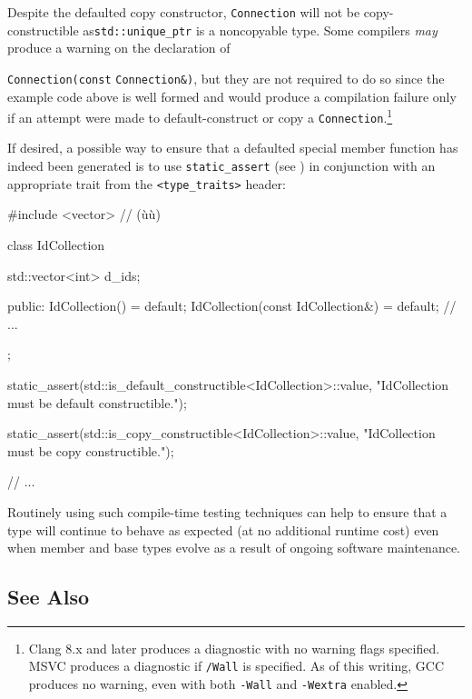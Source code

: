 \noindent Despite the defaulted copy constructor, \lstinline!Connection! will not be
copy-constructible as\linebreak[4] \lstinline!std::unique_ptr! is a noncopyable type.
Some compilers \emph{may} produce a warning on the declaration of
{\lstinline!Connection(const! \lstinline!Connection&)!, but they are not
required to do so since the example code above is well formed and would produce a
compilation failure only if an attempt were made to default-construct or
copy a \lstinline!Connection!.{\cprotect\footnote{Clang 8.x
and later produces a diagnostic with no warning flags specified.
MSVC produces a diagnostic if \lstinline!/Wall! is specified. As of this writing, GCC produces no warning, even with both
  \lstinline!-Wall! and \lstinline!-Wextra! enabled.}}

If desired, a possible way to ensure that a defaulted special member
function has indeed been generated is to use
{\lstinline!static_assert!} (see )
in conjunction with an
appropriate trait from the \lstinline!<type_traits>! header:

\begin{emcppshiddenlisting}[emcppsbatch=e6]
#include <vector>  // (ù{}ù)
\end{emcppshiddenlisting}
\begin{emcppslisting}[emcppsbatch=e6]
class IdCollection
{
    std::vector<int> d_ids;

public:
    IdCollection() = default;
    IdCollection(const IdCollection&) = default;
    // ...
};

static_assert(std::is_default_constructible<IdCollection>::value,
              "IdCollection must be default constructible.");

static_assert(std::is_copy_constructible<IdCollection>::value,
              "IdCollection must be copy constructible.");

// ...
\end{emcppslisting}

\noindent Routinely using such compile-time testing techniques can help to ensure
that a type will continue to behave as expected (at no additional
runtime cost) even when member and base types evolve as a result
of ongoing software maintenance.

\subsection[See Also]{See Also}\label{see-also}

}
